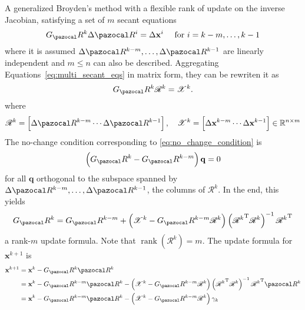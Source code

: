 A generalized Broyden's method with a flexible rank of update on the inverse Jacobian, satisfying a set of \(m\) secant equations
\begin{equation} \label{eq:multi_secant_eqs}
  G_\pazocal R^{k} \Delta \pazocal R^{i}=\Delta \mathbf x^{i} \quad \text { for } i=k-m, \ldots, k-1
\end{equation}
where it is assumed \(\Delta \pazocal R^{k-m}, \ldots, \Delta \pazocal R^{k-1}\) are linearly independent and \(m \leqslant n\) can also be described.
Aggregating Equations~\eqref{eq:multi_secant_eqs} in matrix form, they can be rewriten it as
\begin{equation} \label{eq:multi_secant_eqs_mat}
  G_\pazocal R^{k} \mathscr{R}^{k}=\mathscr{X}^{k}.
\end{equation}
where
\begin{equation}
\mathscr{R}^{k}=\left[\Delta \pazocal R^{k-m} \cdots \Delta \pazocal R^{k-1}\right], \quad \mathscr{X}^{k}=\left[\Delta \mathbf x^{k-m} \cdots \Delta \mathbf x^{k-1}\right] \in \mathbb{R}^{n \times m}
\end{equation}
The no-change condition corresponding to \eqref{eq:no_change_condition} is
\begin{equation}
  \left(G_\pazocal R^{k}-G_\pazocal R^{k-m}\right) \mathbf q=0
\end{equation}
for all \(\mathbf q\) orthogonal to the subspace spanned by \(\Delta \pazocal R^{k-m}, \ldots, \Delta \pazocal R^{k-1}\), the columns of \(\mathscr{R}^{k}\).
In the end, this yields
\begin{equation}
  G_\pazocal R^{k}=G_\pazocal R^{k-m}+\left(\mathscr{X}^{k}-G_\pazocal R^{k-m} \mathscr{R}^{k}\right)\left({\mathscr{R}^{k}}^{\mathrm{T}} \mathscr{R}^{k}\right)^{-1} {\mathscr{R}^{k}}^{\mathrm{T}}
\end{equation}
a rank-\(m\) update formula.
Note that \(\operatorname{rank}\left(\mathscr{R}^{k}\right)=m\).
The update formula for \(\mathbf x^{k+1}\) is
\begin{align}
\mathbf x^{k+1} &=\mathbf x^{k}-G_\pazocal R^{k} \pazocal R^{k} \\
&=\mathbf x^{k}-G_\pazocal R^{k-m} \pazocal R^{k}-\left(\mathscr{X}^{k}-G_\pazocal R^{k-m} \mathscr{R}^{k}\right)\left({\mathscr{R}^{k}}^{\mathrm{T}} \mathscr{R}^{k}\right)^{-1} {\mathscr{R}^{k}}^{\mathrm{T}} \pazocal R^{k} \\
&=\mathbf x^{k}-G_\pazocal R^{k-m} \pazocal R^{k}-\left(\mathscr{X}^{k}-G_\pazocal R^{k-m} \mathscr{R}^{k}\right) \gamma_{k} \label{eq:update_gen_broyden_ls}
\end{align}
